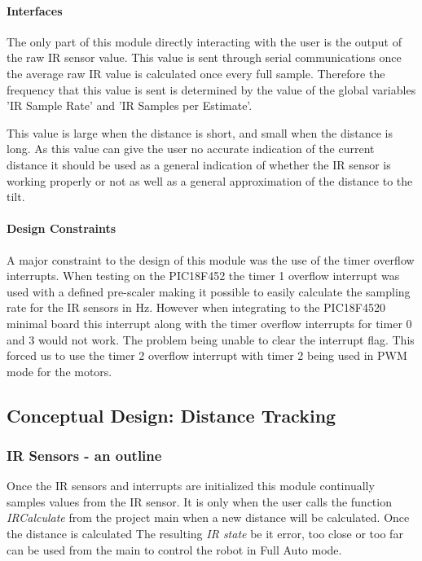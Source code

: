 \documentclass[MTRX3700report.tex]{subfiles}
\begin{document}
\paragraph{Interfaces}

The only part of this module directly interacting with the user is the output of the raw IR sensor value. This value is sent through serial communications once the average raw IR value is calculated once every full sample. Therefore the frequency that this value is sent is determined by the value of the global variables 'IR Sample Rate' and 'IR Samples per Estimate'. 

This value is large when the distance is short, and small when the distance is long. As this value can give the user no accurate indication of the current distance it should be used as a general indication of whether the IR sensor is working properly or not as well as a general approximation of the distance to the tilt.
 
\paragraph{Design Constraints}
A major constraint to the design of this module was the use of the timer overflow interrupts. When testing on the PIC18F452 the timer 1 overflow interrupt was used with a defined pre-scaler making it possible to easily calculate the sampling rate for the IR sensors in Hz. However when integrating to the PIC18F4520 minimal board this interrupt along with the timer overflow interrupts for timer 0 and 3 would not work. The problem being unable to clear the interrupt flag. This forced us to use the timer 2 overflow interrupt with timer 2 being used in PWM mode for the motors.   

\subsection{Conceptual Design: Distance Tracking}


\subsubsection{IR Sensors - an outline}
Once the IR sensors and interrupts are initialized this module continually samples values from the IR sensor. It is only when the user calls the function \textit{IR\textunderscore  Calculate} from the project main when a new distance will be calculated. Once the distance is calculated The resulting \textit{IR state} be it error, too close or too far can be used from the main to control the robot in Full Auto mode.
\end{document}
